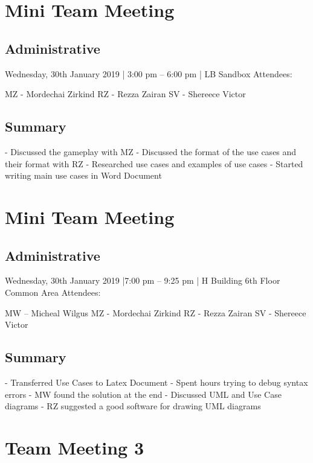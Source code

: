 \documentclass[12pt]{article}
\begin{document}
\pagebreak
\section{Mini Team Meeting }

\subsection{Administrative}
Wednesday, 30th January 2019 | 3:00 pm – 6:00 pm | LB Sandbox
Attendees: 

MZ - Mordechai Zirkind  
RZ - Rezza Zairan 
SV - Shereece Victor 



\subsection{Summary}
-	Discussed the gameplay with MZ 
-	Discussed the format of the use cases and their format with RZ 
-	Researched use cases and examples of use cases 
-	Started writing main use cases in Word Document 



\pagebreak
\section{Mini Team Meeting }

\subsection{Administrative}
Wednesday, 30th January 2019 |7:00 pm – 9:25 pm | H Building 6th Floor Common Area 
Attendees: 

MW – Micheal Wilgus
MZ - Mordechai Zirkind  
RZ - Rezza Zairan 
SV - Shereece Victor 




\subsection{Summary}
-	Transferred Use Cases to Latex Document 
-	Spent hours trying to debug syntax errors
-	MW found the solution at the end 
-	Discussed UML and Use Case diagrams 
-	RZ suggested a good software for drawing UML diagrams 



\pagebreak
\section{Team Meeting 3 }
\end{document}
